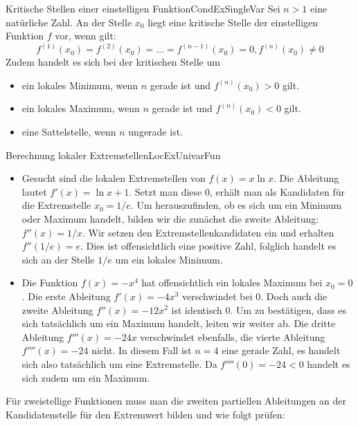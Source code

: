 \begin{statement}{Kritische Stellen einer einstelligen Funktion}{CondExSingleVar}
    Sei $n>1$ eine natürliche Zahl. An der Stelle $x_0$ liegt eine kritische Stelle der einstelligen Funktion $f$ vor, wenn gilt:
    $$
        f^{(1)}(x_0) = f^{(2)}(x_0) = \dots = f^{(n-1)}(x_0) = 0, f^{(n)}(x_0) \ne 0
    $$
    Zudem handelt es sich bei der kritischen Stelle um
    \begin{itemize}
        \item ein lokales Minimum, wenn $n$ gerade ist und $f^{(n)}(x_0) > 0$ gilt.
        \item ein lokales Maximum, wenn $n$ gerade ist und $f^{(n)}(x_0) < 0$ gilt.
        \item eine Sattelstelle, wenn $n$ ungerade ist.
    \end{itemize}
\end{statement}

\begin{example}{Berechnung lokaler Extremstellen}{LocExUnivarFun}
    \begin{itemize}
        \item Gesucht sind die lokalen Extremstellen von $f(x) = x \ln x$. Die Ableitung lautet $f'(x) = \ln x + 1$. Setzt man diese $0$, erhält man als Kandidaten für die Extremstelle $x_0 = 1/e$. Um herauszufinden, ob es sich um ein Minimum oder Maximum handelt, bilden wir die zunächst die zweite Ableitung: $f''(x) = 1 / x$. Wir setzen den Extremstellenkandidaten ein und erhalten $f''(1/e) = e$. Dies ist offensichtlich eine positive Zahl, folglich handelt es sich an der Stelle $1/e$ um ein lokales Minimum.
        \item Die Funktion $f(x) = -x^4$ hat offensichtlich ein lokales Maximum bei $x_0 = 0$. Die erste Ableitung $f'(x) = -4x^3$ verschwindet bei $0$. Doch auch die zweite Ableitung $f''(x) = -12x^2$ ist identisch $0$. Um zu bestätigen, dass es sich tatsächlich um ein Maximum handelt, leiten wir weiter ab. Die dritte Ableitung $f'''(x) = -24x$ verschwindet ebenfalls, die  vierte Ableitung $f''''(x) = -24$ nicht. In diesem Fall ist $n=4$ eine gerade Zahl, es handelt sich also tatsächlich um eine Extremstelle. Da $f''''(0) = -24 < 0$ handelt es sich zudem um ein Maximum.
    \end{itemize}
\end{example}

Für zweistellige Funktionen muss man die zweiten partiellen Ableitungen an der Kandidatenstelle für den Extremwert bilden und wie folgt prüfen:

